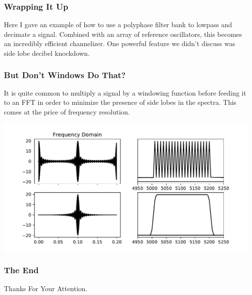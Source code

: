 \documentclass{beamer}
\begin{document}
\begin{frame}
\frametitle{Wrapping It Up}
Here I gave an example of how to use a polyphase filter bank to lowpass and decimate a signal. Combined with an array of reference oscillators, this becomes an incredibly efficient channelizer.  One powerful feature we didn't discuss was side lobe decibel knockdown.   
\end{frame}

\begin{frame}

\frametitle{But Don't Windows Do That?}
It is quite common to multiply a signal by a windowing function before feeding it to an FFT in order to minimize the presence of side lobes in the spectra.  This comes at the price of frequency resolution.

\includegraphics[scale=.55]{Figure_6.pdf}
\end{frame}
\begin{frame}
\frametitle{The End}
\center
\huge Thanks For Your Attention. 
\end{frame}
\end{document}
